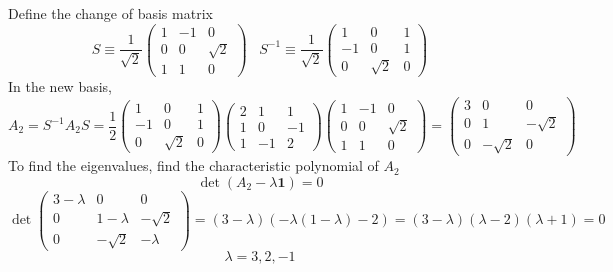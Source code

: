 \begin{sol}
Define the change of basis matrix
$$S\equiv\frac{1}{\sqrt 2}\begin{pmatrix}
1&-1&0\\
0&0&\sqrt{2}\\
1&1&0
\end{pmatrix}\,\,\,\,\,S^{-1}\equiv\frac{1}{\sqrt 2}\begin{pmatrix}
1&0&1\\
-1&0&1\\
0&\sqrt{2}&0
\end{pmatrix}$$ 
In the new basis, 
$$A_2=S^{-1}A_2S=\frac{1}{2}\begin{pmatrix}
1&0&1\\
-1&0&1\\
0&\sqrt{2}&0
\end{pmatrix}\begin{pmatrix}
2&1&1\\1&0&-1\\1&-1&2
\end{pmatrix}\begin{pmatrix}
1&-1&0\\
0&0&\sqrt{2}\\
1&1&0
\end{pmatrix}=\begin{pmatrix}
3&0&0\\
0&1&-\sqrt{2}\\
0&-\sqrt{2}&0
\end{pmatrix}$$ 
To find the eigenvalues, find the characteristic polynomial of $A_2$
$$\det(A_2-\lambda\mathbf{1})=0$$ 
$$\det\begin{pmatrix}
3-\lambda&0&0\\
0&1-\lambda&-\sqrt{2}\\
0&-\sqrt{2}&-\lambda
\end{pmatrix}=(3-\lambda)(-\lambda(1-\lambda)-2)=(3-\lambda)(\lambda-2)(\lambda+1)=0$$ 
$$\lambda={3,2,-1}$$ 
\end{sol}